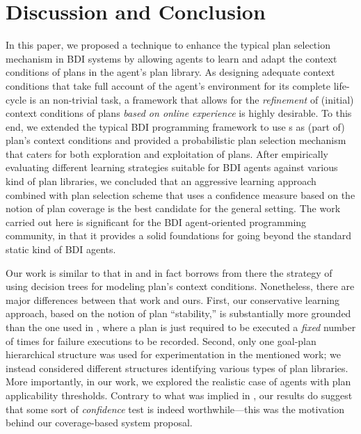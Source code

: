 \section{Discussion and Conclusion}\label{sec:discussion}

In this paper, we proposed a technique to enhance the typical plan selection
mechanism in BDI systems by allowing agents to learn and adapt the context
conditions of plans in the agent's plan library.
As designing adequate context conditions that take full account of the agent's
environment for its complete life-cycle is an non-trivial task, a framework that
allows for the \emph{refinement} of (initial) context conditions of plans
\textit{based on online experience} is highly desirable.
To this end, we extended the typical BDI programming framework to use \dt{}s as
(part of) plan's context conditions and provided a probabilistic plan selection
mechanism that caters for both exploration and exploitation of plans.
After empirically evaluating different learning strategies suitable for BDI
agents against various kind of plan libraries, we concluded that an aggressive
learning approach combined with plan selection scheme that uses a confidence
measure based on the notion of plan coverage is the best candidate for the
general setting.
The work carried out here is significant for the BDI agent-oriented programming
community, in that it provides a solid foundations for going beyond the standard
static kind of BDI agents.


Our work is similar to that in \cite{APSS08} and in fact borrows from there the
strategy of using decision trees for modeling plan's context conditions.
Nonetheless, there are major differences between that work and ours.
First, our conservative learning approach, based on the notion of plan
``stability,'' is substantially more grounded than the one used in \cite{APSS08},
where a plan is just required to be executed a \emph{fixed} number of times for
failure executions to be recorded.
Second, only one goal-plan hierarchical structure was used for experimentation
in the mentioned work; we instead considered different structures identifying
various types of plan libraries.
More importantly, in our work, we explored the realistic case of agents with
plan applicability thresholds. Contrary to what was implied in \cite{APSS08}, our
results do suggest that some sort of \emph{confidence} test is indeed
worthwhile---this was the motivation behind our coverage-based system 
proposal.



